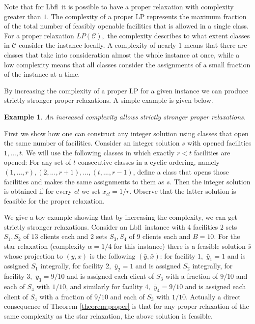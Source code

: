 \documentclass[11pt]{article}\usepackage{amsmath}
\newtheorem{example}{Example}[section]
\newcommand{\lbfl}{{\sc Lbfl}}
\begin{document}
Note that for \lbfl\ it is possible  to have a proper relaxation with complexity greater
than $1$. 
The  complexity of  a  proper LP  represents the  maximum
fraction of the  total number of feasibly openable  facilities that is
allowed in a single class. 
For   a  proper relaxation  $LP(\mathcal{C}),$ the  complexity
describes to what extent 
 classes in $\mathcal{C}$ consider the instance locally. 
A complexity of nearly $1$
means that there are classes that take into consideration almost the whole instance
at once, while a low complexity means that all classes consider
the assignments of a small fraction of the instance at a time.  
\iffalse ===========================
We remark
that    the   proper    LP    with   an    integral   polytope    from
Theorem~\ref{thm:gap1} has
a complexity of  $1$ since every class corresponds  by construction to
a feasible integral solution. 
(Clearly not every LP with complexity $1$ has an integrality gap of $1$
since it might contain weak classes together with the strong
ones.) 
============ \fi 
By increasing the complexity of a proper LP  for a given instance 
 we can produce strictly stronger 
proper relaxations. A simple example is given below. 


\begin{example}\label{proper_str}
An increased complexity allows strictly stronger proper relaxations.
\end{example}

First we show how one can construct any integer solution using classes that open the
same number of facilities.
Consider an integer solution $s$ with opened facilities $1,...,t$. We will use the following classes 
in which exactly $r<t$ facilities are opened:
For any set of  $t$ consecutive classes in a cyclic ordering, namely $(1,...,r),(2,...,r+1),...,(t,...,r-1)$, define a class that opens those facilities and makes the same assignments to them 
as $s$. Then the integer solution is obtained  if for every $cl$ we set $x_{cl}=1/r$.
Observe that the latter solution is feasible for the proper relaxation.

We give a toy example showing that by increasing the complexity, we can
get strictly stronger relaxations. Consider an \lbfl\ instance with $4$ facilities $2$ sets $S_1,S_2$
of $13$ clients each and 2 sets $S_3,S_4$ of $9$ clients each and $B=10$.  For the star relaxation
(complexity $\alpha=1/4$ for this instance)
there is a feasible solution $\bar{s}$ whose projection to $(y,x)$
 is the following $(\bar{y},\bar{x})$: for facility $1,$ $\bar{y}_1=1$ and is assigned $S_1$ integrally, for facility $2,$ $\bar{y}_2=1$ and is assigned $S_2$ integrally, for facility $3,$ $\bar{y}_3=9/10$ and is assigned each client of $S_3$ with a fraction of $9/10$ and each of $S_4$ with $1/10$, and similarly for facility $4,$ $\bar{y}_4=9/10$ and is assigned
each client of $S_4$ with a fraction of $9/10$ and each of $S_3$ with $1/10$. Actually
a direct consequence of Theorem \ref{theorem:proper} is that for any proper relaxation of the same complexity as the star relaxation, the above solution is feasible.
\end{document}
